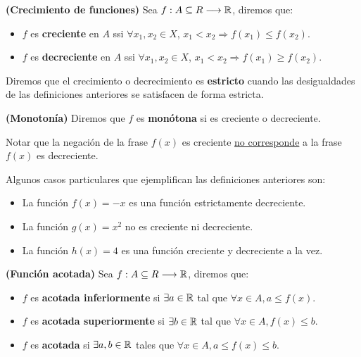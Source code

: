 \begin{definicion}
	\textbf{(Crecimiento de funciones)}
	Sea $f: A \subseteq R \longrightarrow \mathbb{R}$, diremos que: 
	\begin{itemize}
		\item $f$ es \textbf{creciente} en $ A$ ssi $\forall x_1, x_2 \in X$, $x_1 < x_2 \Longrightarrow f(x_1) \leq f(x_2)$. 
		\item $f$ es \textbf{decreciente} en $A$ ssi $\forall x_1, x_2 \in X$, $x_1 < x_2 \Longrightarrow f(x_1) \geq f(x_2)$. 
	\end{itemize} 
	Diremos que el crecimiento o decrecimiento es \textbf{estricto} cuando las desigualdades de las definiciones anteriores se satisfacen de forma estricta. 
\end{definicion}

\begin{definicion}
	\textbf{(Monotonía)}
	Diremos que $f$ es \textbf{monótona} si es creciente o decreciente. 
\end{definicion}

\begin{nota}
	Notar que la negación de la frase $f(x)$ es creciente \underline{no corresponde} a la frase $f(x)$ es decreciente.
\end{nota}

\begin{ejemplo}
	Algunos casos particulares que ejemplifican las definiciones anteriores son: 
	\begin{itemize}
		\item La función $f(x)= -x$ es una función estrictamente decreciente. 
		\item La función $g(x) = x^2$ no es creciente ni decreciente. 
		\item La función $h(x) = 4$ es una función creciente y decreciente a la vez. 
	\end{itemize}
\end{ejemplo}


\begin{definicion}
	\textbf{(Función acotada)} 
	Sea $f: A \subseteq R \longrightarrow \mathbb{R}$, diremos que: 
	\begin{itemize}
		\item $f$ es \textbf{acotada inferiormente} si $\exists a \in \mathbb{R}$ tal que $\forall x \in A, a \leq f(x)$. 
		\item $f$ es \textbf{acotada superiormente} si $\exists b \in \mathbb{R}$ tal que $\forall x \in A, f(x) \leq b$. 
		\item $f$ es \textbf{acotada} si $\exists a, b \in \mathbb{R}$ tales que $\forall x \in A, a \leq f(x) \leq b$. 
	\end{itemize}
\end{definicion}

